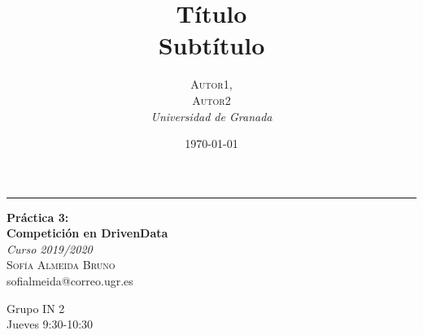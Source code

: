 \documentclass[a4paper, 20pt]{article}
\title{\textbf{Título}\\ %
Subtítulo} %
\author{\textsc{Autor1,\\Autor2} %
\\{\textit{Universidad de Granada}}} %
\date{\today} %
\begin{document}

\begin{titlepage} %
	
	\raggedleft %
	
	\rule{1pt}{\textheight} %
	\hspace{0.05\textwidth} %
	\parbox[b]{0.8\textwidth}{ %
		
		{\Huge\bfseries Práctica 3:\\[0.5\baselineskip] Competición en DrivenData}\\[2\baselineskip] %
		{\large\textit{Curso 2019/2020}}\\[4\baselineskip] %
		{\Large\textsc{Sofía Almeida Bruno}\\[0.5\baselineskip]sofialmeida@correo.ugr.es} %
		
		\vspace{0.4\textheight} %
		
		{\noindent Grupo IN 2\\[0.5\baselineskip] Jueves 9:30-10:30}\\[\baselineskip] %
	}

\end{titlepage}




{\parskip=2pt
  \tableofcontents
}
\pagebreak

\end{document}
